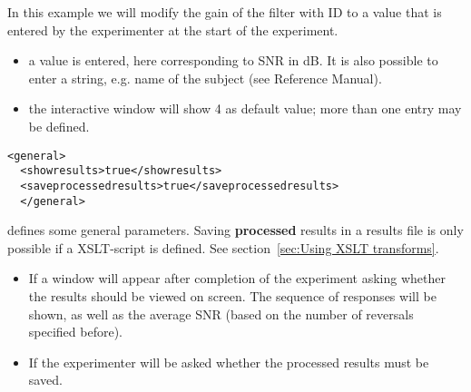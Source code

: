 In this example we will modify the gain of the filter with ID
 to a value that is entered by the experimenter at
the start of the experiment.

\begin{itemize}
\item {} a value is entered, here corresponding
to SNR in dB. It is also possible to enter a string, e.g. name of
the subject (see Reference Manual).

\item {} the interactive window will show 4 as
default value; more than one entry may be defined.
\end{itemize}




\begin{lstlisting}
<general>
  <showresults>true</showresults>
  <saveprocessedresults>true</saveprocessedresults>
  </general>
\end{lstlisting}

 defines some general parameters. Saving
\textbf{processed} results in a results file is only possible if a
XSLT-script is defined. See section~\ref{sec:Using XSLT
transforms}.

\begin{itemize}
\item {} If  a window will appear
after completion of the experiment asking whether the results
should be viewed on screen. The sequence of responses will be
shown, as well as the average SNR (based on the number of
reversals specified before).

\item {} If  the
experimenter will be asked whether the processed results must be
saved.
\end{itemize}


  
